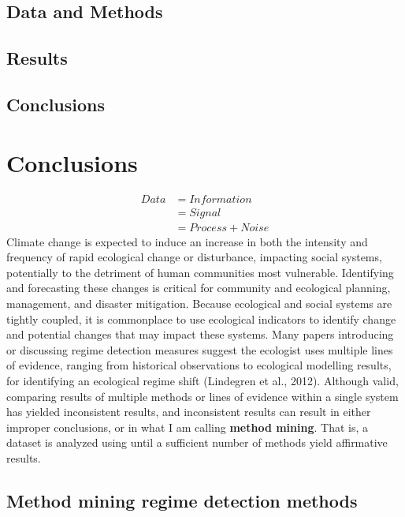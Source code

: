 \documentclass[12pt,twoside,openany]{reedthesis}
\begin{document}
\section{Data and Methods}\label{data-and-methods-2}

\section{Results}\label{results-3}

\section{Conclusions}\label{conclusions-1}

\chapter{Conclusions}\label{conclusions}
\begin{equation}
\begin{split}
Data  & = Information \\
& = Signal \\
& = Process + Noise
\end{split}
\label{eq:infoTheory}
\end{equation}
Climate change is expected to induce an increase in both the intensity
and frequency of rapid ecological change or disturbance, impacting
social systems, potentially to the detriment of human communities most
vulnerable. Identifying and forecasting these changes is critical for
community and ecological planning, management, and disaster mitigation.
Because ecological and social systems are tightly coupled, it is
commonplace to use ecological indicators to identify change and
potential changes that may impact these systems. Many papers introducing
or discussing regime detection measures suggest the ecologist uses
multiple lines of evidence, ranging from historical observations to
ecological modelling results, for identifying an ecological regime shift
(Lindegren et al., 2012). Although valid, comparing results of multiple
methods or lines of evidence within a single system has yielded
inconsistent results, and inconsistent results can result in either
improper conclusions, or in what I am calling \textbf{method mining}.
That is, a dataset is analyzed using until a sufficient number of
methods yield affirmative results.

\section{Method mining regime detection
methods}\label{method-mining-regime-detection-methods}
\end{document}
